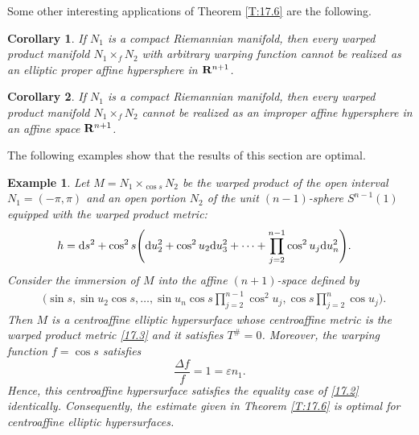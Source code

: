 \documentclass{amsart}
\theoremstyle{plain}
\newtheorem{corollary}{Corollary}[section]
\newtheorem{example}{Example}[section]
\numberwithin{equation}{section}
\theoremstyle{remark}
\numberwithin{equation}{section}
\begin{document}
Some other interesting applications of Theorem \ref{T:17.6} are the following.

 \begin{corollary} \label{C:17.5}  If $N_1$ is a compact Riemannian manifold, then every  warped product manifold  $N_1\times_f N_2$ with arbitrary warping function cannot be realized
as an elliptic  proper affine hypersphere in  ${\bf R}^{n+1}$. \end{corollary}

 \begin{corollary} \label{C:17.6}  If $N_1$ is a compact Riemannian manifold, then every  warped product manifold  $N_1\times_f N_2$ cannot be realized
as an improper affine hypersphere in an affine space ${\bf R}^{n+1}$. \end{corollary}

The following examples  show that the results of this section are optimal.

\begin{example}\label{E:17.1} {\rm Let $M=N_1\times_{\cos s} N_2$  be the warped product of the open interval  $ N_1=(-\pi,\pi)$ and an open portion $N_2$ of the unit $(n-1)$-sphere $S^{n-1}(1)$ equipped with the warped product metric: 
\begin{equation}\begin{aligned}\label{17.3} &h={\rm d}s^2+\cos^2 s\Bigg({\rm d}u_2^2+\cos^2u_2{\rm d}u_3^2+\cdots+\prod_{j=2}^{n-1}\cos^2 u_j{\rm d}u_n^2\Bigg).
\end{aligned}\end{equation}
Consider the immersion of $M$ into the affine $(n+1)$-space  defined by
\begin{equation}\begin{aligned}\label{17.4} &\Bigg(\sin s,\sin u_2\cos s,\ldots,  \sin u_n \cos s\prod_{j=2}^{n-1}\cos^2 u_j ,\cos s\prod_{j=2}^{n}\cos u_j\Bigg). \end{aligned}\end{equation}
Then $M$ is a  centroaffine elliptic   hypersurface whose  centroaffine metric is the warped product metric  \eqref{17.3} and it satisfies $T^\#=0$. Moreover, the warping function $f=\cos s$ satisfies $$\frac{\Delta f}{f}=1=\varepsilon n_1.$$ Hence, this centroaffine hypersurface satisfies the equality case of \eqref{17.2} identically. Consequently, the estimate given in Theorem \ref{T:17.6} is optimal for centroaffine elliptic  hypersurfaces.}
\end{example}
\end{document}

